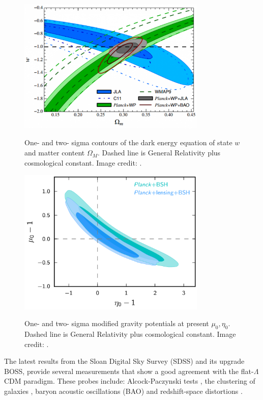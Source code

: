 \begin{figure}
\begin{center}
\includegraphics[width=0.8\textwidth]{./Pictures/JLA_w.png}
\caption{One- and two- sigma contours of the dark energy equation of state $w$ and matter content $\Omega_M$. Dashed line is General Relativity plus cosmological constant. Image credit: \cite{2014A&A...568A..22B}.}
\label{fig:jlaw0}
\vspace*{0.2cm}
\includegraphics[width=0.8\textwidth]{./Pictures/mg_planck2015.png}
\caption{One- and two- sigma modified gravity potentials at present $\mu_0,\eta_0$. Dashed line is General Relativity plus cosmological constant. Image credit: \cite{2016A&A...594A..14P}.}
\label{fig:mg_planck2015}
\end{center}
\end{figure}
The latest results from the Sloan Digital Sky Survey (SDSS) and its upgrade BOSS, provide several measurements that show a good agreement with the flat-$\Lambda$CDM paradigm. These probes include: Alcock-Paczynski tests \cite{2016ApJ...832..103L}, the clustering of galaxies \cite{2016arXiv160703155A}, baryon acoustic oscillations (BAO) \cite{2016arXiv160703154W,2017arXiv170200176B} and redshift-space distortions \cite{2017MNRAS.465.1757G}.
\newline

